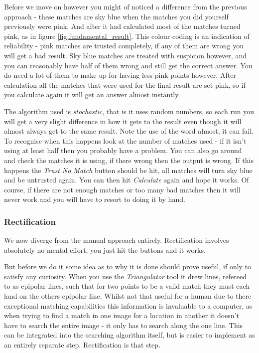 \documentclass[10pt,a4paper,twoside]{article}
\begin{document}
Before we move on however you might of noticed a difference from the previous approach - these matches are sky blue when the matches you did yourself previously were pink. And after it had calculated most of the matches turned pink, as in figure \ref{fig:fundamental_result}. This colour coding is an indication of reliability - pink matches are trusted completely, if any of them are wrong you will get a bad result. Sky blue matches are treated with suspicion however, and you can reasonably have half of them wrong and still get the correct answer. You do need a lot of them to make up for having less pink points however. After calculation all the matches that were used for the final result are set pink, so if you calculate again it will get an answer almost instantly.

The algorithm used is \emph{stochastic}, that is it uses random numbers, so each run you will get a very slight difference in how it gets to the result even though it will almost always get to the same result. Note the use of the word almost, it can fail. To recognise when this happens look at the number of matches used - if it isn't using at least half then you probably have a problem. You can also go around and check the matches it is using, if there wrong then the output is wrong. If this happens the \emph{Trust No Match} button should be hit, all matches will turn sky blue and be untrusted again. You can then hit \emph{Calculate} again and hope it works. Of course, if there are not enough matches or too many bad matches then it will never work and you will have to resort to doing it by hand.


\subsubsection {Rectification}
We now diverge from the manual approach entirely. Rectification involves absolutely no mental effort, you just hit the buttons and it works.

But before we do it some idea as to why it is done should prove useful, if only to satisfy any curiosity. When you use the \emph{Triangulator} tool it drew lines, refereed to as epipolar lines, such that for two points to be a valid match they must each land on the others epipolar line. Whilst not that useful for a human due to there exceptional matching capabilities this information is invaluable to a computer, as when trying to find a match in one image for a location in another it doesn't have to search the entire image - it only has to search along the one line. This can be integrated into the searching algorithm itself, but is easier to implement as an entirely separate step. Rectification is that step.
\end{document}
